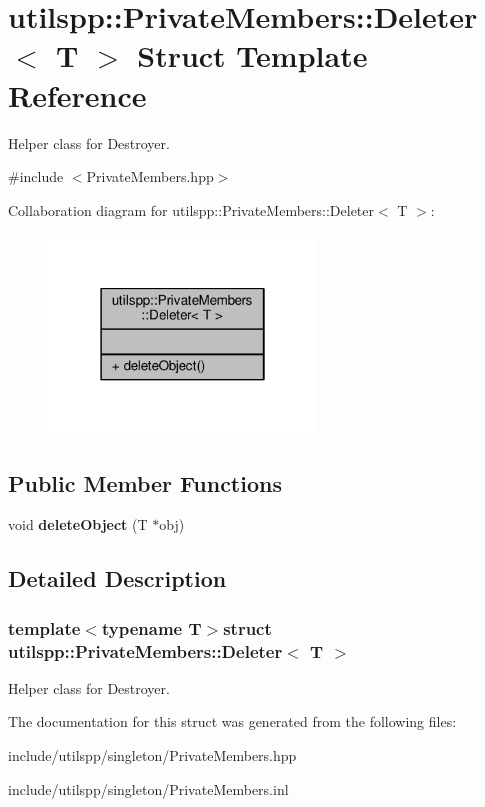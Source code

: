 \hypertarget{structutilspp_1_1PrivateMembers_1_1Deleter}{\section{utilspp\-:\-:Private\-Members\-:\-:Deleter$<$ T $>$ Struct Template Reference}
\label{structutilspp_1_1PrivateMembers_1_1Deleter}
}


Helper class for Destroyer.  




{\ttfamily \#include $<$Private\-Members.\-hpp$>$}



Collaboration diagram for utilspp\-:\-:Private\-Members\-:\-:Deleter$<$ T $>$\-:\nopagebreak
\begin{figure}[H]
\begin{center}
\leavevmode
\includegraphics[width=202pt]{structutilspp_1_1PrivateMembers_1_1Deleter__coll__graph}
\end{center}
\end{figure}
\subsection*{Public Member Functions}
\begin{DoxyCompactItemize}
\item 
\hypertarget{structutilspp_1_1PrivateMembers_1_1Deleter_ac1733f7f90b94aaba61df48476bfba4a}{void {\bfseries delete\-Object} (T $\ast$obj)}\label{structutilspp_1_1PrivateMembers_1_1Deleter_ac1733f7f90b94aaba61df48476bfba4a}

\end{DoxyCompactItemize}


\subsection{Detailed Description}
\subsubsection*{template$<$typename T$>$struct utilspp\-::\-Private\-Members\-::\-Deleter$<$ T $>$}

Helper class for Destroyer. 

The documentation for this struct was generated from the following files\-:\begin{DoxyCompactItemize}
\item 
include/utilspp/singleton/Private\-Members.\-hpp\item 
include/utilspp/singleton/Private\-Members.\-inl\end{DoxyCompactItemize}
